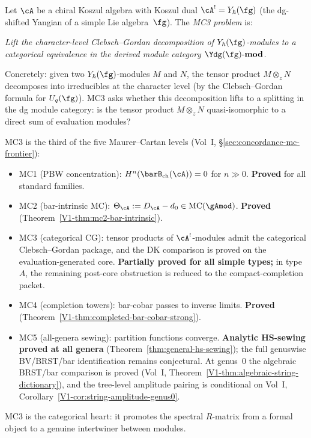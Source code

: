 \begin{definition}
Let $\cA$ be a chiral Koszul algebra with Koszul dual
$\cA^!=Y_\hbar(\fg)$ (the dg-shifted Yangian of a simple
Lie algebra~$\fg$). The \emph{MC3 problem} is:

\emph{Lift the character-level Clebsch--Gordan
decomposition of $Y_\hbar(\fg)$-modules to a categorical
equivalence in the derived module category
$\Ydg(\fg)\text{-}\mathbf{mod}$.}

Concretely: given two $Y_\hbar(\fg)$-modules $M$ and $N$,
the tensor product $M\otimes_z N$ decomposes into
irreducibles at the character level
(by the Clebsch--Gordan formula for $U_q(\fg)$).
MC3 asks whether this decomposition lifts to a
splitting in the dg module category: is the
tensor product $M\otimes_z N$ quasi-isomorphic to a
direct sum of evaluation modules?
\end{definition}

\begin{remark}
MC3 is the third of the five Maurer--Cartan levels
(Vol~I, \S\ref*{sec:concordance-mc-frontier}):
\begin{itemize}
\item MC1 (PBW concentration): $H^n(\barB_{\mathrm{ch}}(\cA))
 =0$ for $n\gg 0$. \textbf{Proved} for all standard
 families.
\item MC2 (bar-intrinsic MC): $\Theta_\cA:=D_\cA-d_0
 \in\mathrm{MC}(\gAmod)$. \textbf{Proved}
 (Theorem~\ref*{V1-thm:mc2-bar-intrinsic}).
\item MC3 (categorical CG): tensor products of
 $\cA^!$-modules admit the categorical Clebsch--Gordan package, and
 the DK comparison is proved on the evaluation-generated core.
 \textbf{Partially proved for all simple types;} in type~$A$, the
 remaining post-core obstruction is reduced to the
 compact-completion packet.
\item MC4 (completion towers): bar-cobar passes to
 inverse limits. \textbf{Proved}
 (Theorem~\ref*{V1-thm:completed-bar-cobar-strong}).
\item MC5 (all-genera sewing): partition functions converge.
 \textbf{Analytic HS-sewing proved at all genera}
 (Theorem~\ref*{thm:general-hs-sewing});
 the full genuswise BV/BRST/bar identification remains
 conjectural. At genus~$0$ the algebraic BRST/bar comparison
 is proved
 (Vol~I, Theorem~\ref*{V1-thm:algebraic-string-dictionary}),
 and the tree-level amplitude pairing is conditional on
 Vol~I, Corollary~\ref*{V1-cor:string-amplitude-genus0}.
\end{itemize}
MC3 is the categorical heart: it promotes the spectral
$R$-matrix from a formal object to a genuine
intertwiner between modules.
\end{remark}

